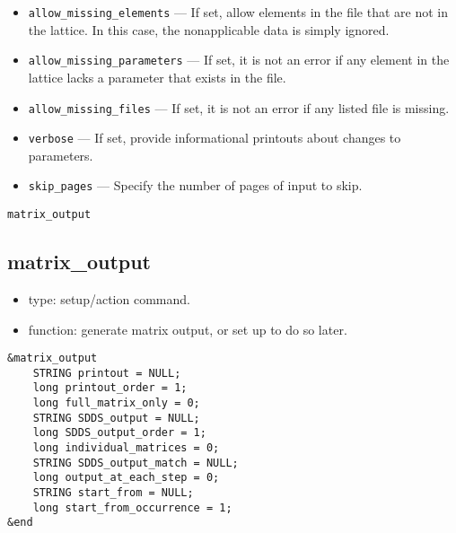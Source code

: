 \documentclass[11pt]{article}
\begin{document}
\begin{itemize}
\item \verb|allow_missing_elements| --- If set, allow elements in the
file that are not in the lattice.  In this case, the nonapplicable
data is simply ignored.

\item \verb|allow_missing_parameters| --- If set, it is not an error
if any element in the lattice lacks a parameter that exists in the file.

\item \verb|allow_missing_files| --- If set, it is not an error
if any listed file is missing.

\item \verb|verbose| --- If set, provide informational printouts about
changes to parameters.

\item \verb|skip_pages| --- Specify the number of pages of input to skip.

\end{itemize}

\newpage
\begin{center}{\Large\verb|matrix_output|}\end{center}
\subsection{matrix\_output \label{subsec:matrixoutput}}

\begin{itemize}
\item type: setup/action command.
\item function: generate matrix output, or set up to do so later.
\end{itemize}

\begin{verbatim}
&matrix_output
    STRING printout = NULL;
    long printout_order = 1;
    long full_matrix_only = 0;
    STRING SDDS_output = NULL;
    long SDDS_output_order = 1;
    long individual_matrices = 0;
    STRING SDDS_output_match = NULL;
    long output_at_each_step = 0;
    STRING start_from = NULL;
    long start_from_occurrence = 1;
&end
\end{verbatim}
\end{document}
